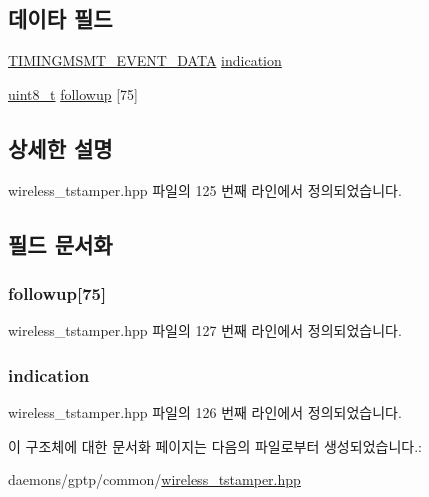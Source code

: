 \subsection*{데이타 필드}
\begin{DoxyCompactItemize}
\item 
\hyperlink{wireless__tstamper_8hpp_a9d0ca4b2a8261e1a37a8b349ecf1fe4a}{T\+I\+M\+I\+N\+G\+M\+S\+M\+T\+\_\+\+E\+V\+E\+N\+T\+\_\+\+D\+A\+TA} \hyperlink{struct_s8021_a_s___indication_ab7860ea6578f5d3587edd42f4016e389}{indication}
\item 
\hyperlink{stdint_8h_aba7bc1797add20fe3efdf37ced1182c5}{uint8\+\_\+t} \hyperlink{struct_s8021_a_s___indication_a452e02cb910910cd26dbf270028978e6}{followup} \mbox{[}75\mbox{]}
\end{DoxyCompactItemize}


\subsection{상세한 설명}


wireless\+\_\+tstamper.\+hpp 파일의 125 번째 라인에서 정의되었습니다.



\subsection{필드 문서화}
\subsubsection[{\texorpdfstring{followup}{followup}}]{ followup\mbox{[}75\mbox{]}}\hypertarget{struct_s8021_a_s___indication_a452e02cb910910cd26dbf270028978e6}{}\label{struct_s8021_a_s___indication_a452e02cb910910cd26dbf270028978e6}


wireless\+\_\+tstamper.\+hpp 파일의 127 번째 라인에서 정의되었습니다.

\subsubsection[{\texorpdfstring{indication}{indication}}]{ indication}\hypertarget{struct_s8021_a_s___indication_ab7860ea6578f5d3587edd42f4016e389}{}\label{struct_s8021_a_s___indication_ab7860ea6578f5d3587edd42f4016e389}


wireless\+\_\+tstamper.\+hpp 파일의 126 번째 라인에서 정의되었습니다.



이 구조체에 대한 문서화 페이지는 다음의 파일로부터 생성되었습니다.\+:\begin{DoxyCompactItemize}
\item 
daemons/gptp/common/\hyperlink{wireless__tstamper_8hpp}{wireless\+\_\+tstamper.\+hpp}\end{DoxyCompactItemize}
